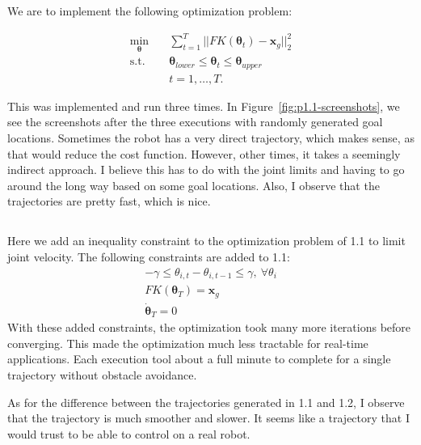 \documentclass{article}
\renewcommand{\vec}[1]{\bm{#1}}
\begin{document}
We are to implement the following optimization problem:

\begin{align*}
  \min_{\vec{\theta}}
    & \quad
      \sum_{t = 1}^T
      ||
      FK(\vec{\theta}_t) - \vec{x}_g
      ||^2_2
  \\
  \text{s.t.}
    & \quad
      \vec{\theta}_{lower}
        \leq
      \vec{\theta}_t
        \leq
      \vec{\theta}_{upper}
  \\
    & \quad
      t = 1, \ldots, T.
\end{align*}

This was implemented and run three times.
%
In Figure~\ref{fig:p1.1-screenshots}, we see the screenshots after the three
executions with randomly generated goal locations.
%
Sometimes the robot has a very direct trajectory, which makes sense, as that
would reduce the cost function.
%
However, other times, it takes a seemingly indirect approach.
%
I believe this has to do with the joint limits and having to go around the long
way based on some goal locations.
%
Also, I observe that the trajectories are pretty fast, which is nice.


\subsection{}

Here we add an inequality constraint to the optimization problem of 1.1 to
limit joint velocity.
%
The following constraints are added to 1.1:
%
\begin{align*}
  -\gamma \leq \theta_{i,t} - \theta_{i,t - 1} \leq \gamma,
    ~
    \forall \theta_i
  \\
  FK(\vec{\theta}_T) = \vec{x}_g
  \\
  \dot{\vec{\theta}}_T = 0
\end{align*}
%
With these added constraints, the optimization took many more iterations before
converging.
%
This made the optimization much less tractable for real-time applications.
%
Each execution tool about a full minute to complete for a single trajectory
without obstacle avoidance.


As for the difference between the trajectories generated in 1.1 and 1.2, I
observe that the trajectory is much smoother and slower.
%
It seems like a trajectory that I would trust to be able to control on a real
robot.



\subsection{}
\end{document}
